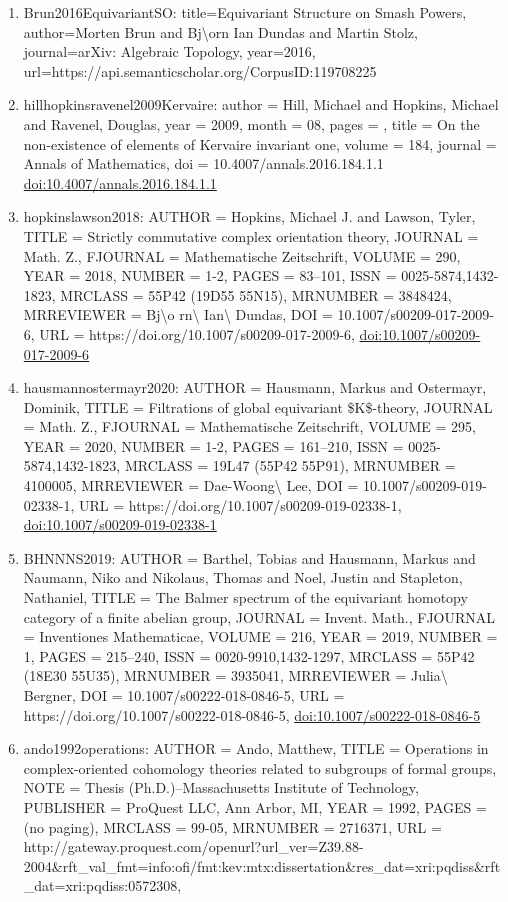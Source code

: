 \documentclass[11pt]{article}
\begin{document}
\begin{enumerate}[leftmargin=*]
  \item Brun2016EquivariantSO: title=Equivariant Structure on Smash Powers, author=Morten Brun and Bj\textbackslash{}orn Ian Dundas and Martin Stolz, journal=arXiv: Algebraic Topology, year=2016, url=https://api.semanticscholar.org/CorpusID:119708225
  \item hillhopkinsravenel2009Kervaire: author = Hill, Michael and Hopkins, Michael and Ravenel, Douglas, year = 2009, month = 08, pages = , title = On the non-existence of elements of Kervaire invariant one, volume = 184, journal = Annals of Mathematics, doi = 10.4007/annals.2016.184.1.1 \href{https://doi.org/10.4007/annals.2016.184.1.1}{doi:10.4007/annals.2016.184.1.1}
  \item hopkinslawson2018: AUTHOR = Hopkins, Michael J. and Lawson, Tyler, TITLE = Strictly commutative complex orientation theory, JOURNAL = Math. Z., FJOURNAL = Mathematische Zeitschrift, VOLUME = 290, YEAR = 2018, NUMBER = 1-2, PAGES = 83--101, ISSN = 0025-5874,1432-1823, MRCLASS = 55P42 (19D55 55N15), MRNUMBER = 3848424, MRREVIEWER = Bj\textbackslash{}o rn\textbackslash{} Ian\textbackslash{} Dundas, DOI = 10.1007/s00209-017-2009-6, URL = https://doi.org/10.1007/s00209-017-2009-6, \href{https://doi.org/10.1007/s00209-017-2009-6}{doi:10.1007/s00209-017-2009-6}
  \item hausmannostermayr2020: AUTHOR = Hausmann, Markus and Ostermayr, Dominik, TITLE = Filtrations of global equivariant \$K\$-theory, JOURNAL = Math. Z., FJOURNAL = Mathematische Zeitschrift, VOLUME = 295, YEAR = 2020, NUMBER = 1-2, PAGES = 161--210, ISSN = 0025-5874,1432-1823, MRCLASS = 19L47 (55P42 55P91), MRNUMBER = 4100005, MRREVIEWER = Dae-Woong\textbackslash{} Lee, DOI = 10.1007/s00209-019-02338-1, URL = https://doi.org/10.1007/s00209-019-02338-1, \href{https://doi.org/10.1007/s00209-019-02338-1}{doi:10.1007/s00209-019-02338-1}
  \item BHNNNS2019: AUTHOR = Barthel, Tobias and Hausmann, Markus and Naumann, Niko and Nikolaus, Thomas and Noel, Justin and Stapleton, Nathaniel, TITLE = The Balmer spectrum of the equivariant homotopy category of a finite abelian group, JOURNAL = Invent. Math., FJOURNAL = Inventiones Mathematicae, VOLUME = 216, YEAR = 2019, NUMBER = 1, PAGES = 215--240, ISSN = 0020-9910,1432-1297, MRCLASS = 55P42 (18E30 55U35), MRNUMBER = 3935041, MRREVIEWER = Julia\textbackslash{} Bergner, DOI = 10.1007/s00222-018-0846-5, URL = https://doi.org/10.1007/s00222-018-0846-5, \href{https://doi.org/10.1007/s00222-018-0846-5}{doi:10.1007/s00222-018-0846-5}
  \item ando1992operations: AUTHOR = Ando, Matthew, TITLE = Operations in complex-oriented cohomology theories related to subgroups of formal groups, NOTE = Thesis (Ph.D.)--Massachusetts Institute of Technology, PUBLISHER = ProQuest LLC, Ann Arbor, MI, YEAR = 1992, PAGES = (no paging), MRCLASS = 99-05, MRNUMBER = 2716371, URL = http://gateway.proquest.com/openurl?url\_ver=Z39.88-2004\&rft\_val\_fmt=info:ofi/fmt:kev:mtx:dissertation\&res\_dat=xri:pqdiss\&rft\_dat=xri:pqdiss:0572308,

\end{enumerate}
\end{document}
